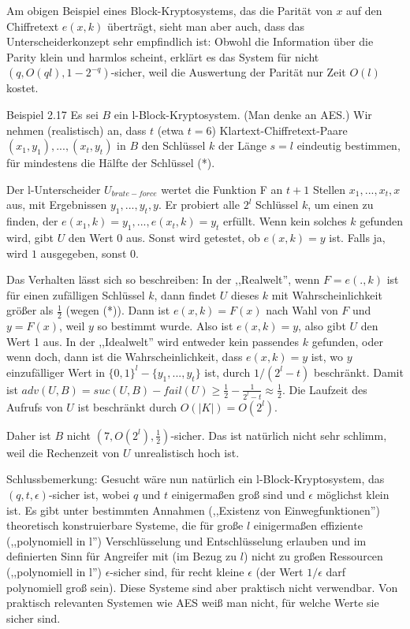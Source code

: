 \documentclass[a4paper]{article}
\begin{document}
\begin{multicols}{3}
    Am obigen Beispiel eines Block-Kryptosystems, das die Parität von $x$ auf den Chiffretext $e(x,k)$ überträgt, sieht man aber auch, dass das Unterscheiderkonzept sehr empfindlich ist: Obwohl die Information über die Parity klein und harmlos scheint, erklärt es das System für nicht $(q,O(ql), 1-2^{-q})$-sicher, weil die Auswertung der Parität nur Zeit $O(l)$ kostet.

    Beispiel 2.17 Es sei $B$ ein l-Block-Kryptosystem. (Man denke an AES.) Wir nehmen (realistisch) an, dass $t$ (etwa $t=6$) Klartext-Chiffretext-Paare $(x_1,y_1),...,(x_t,y_t)$ in $B$ den Schlüssel $k$ der Länge $s=l$ eindeutig bestimmen, für mindestens die Hälfte der Schlüssel (*).

    Der l-Unterscheider $U_{brute-force}$ wertet die Funktion F an $t+1$ Stellen $x_1,...,x_t,x$ aus, mit Ergebnissen $y_1,...,y_t,y$. Er probiert alle $2^l$ Schlüssel $k$, um einen zu finden, der $e(x_1,k)=y_1 ,...,e(x_t,k) =y_t$ erfüllt. Wenn kein solches $k$ gefunden wird, gibt $U$ den Wert $0$ aus.
    Sonst wird getestet, ob $e(x,k)=y$ ist. Falls ja, wird $1$ ausgegeben, sonst $0$.

    Das Verhalten lässt sich so beschreiben: In der ,,Realwelt'', wenn $F=e(.,k)$ ist für einen zufälligen Schlüssel $k$, dann findet $U$ dieses $k$ mit Wahrscheinlichkeit größer als $\frac{1}{2}$ (wegen (*)). Dann ist $e(x,k) =F(x)$ nach Wahl von $F$ und $y=F(x)$, weil $y$ so bestimmt wurde.
    Also ist $e(x,k) =y$, also gibt $U$ den Wert 1 aus. In der ,,Idealwelt'' wird entweder kein passendes $k$ gefunden, oder wenn doch, dann ist die Wahrscheinlichkeit, dass $e(x,k) =y$ ist, wo $y$ einzufälliger Wert in $\{0,1\}^l-\{y_1,...,y_t\}$ ist, durch $1/(2^l-t)$ beschränkt. Damit ist $adv(U,B) = suc(U,B)-fail(U)\geq \frac{1}{2}-\frac{1}{2^l-t}\approx\frac{1}{2}$.
    Die Laufzeit des Aufrufs von $U$ ist beschränkt durch $O(|K|) =O(2^l)$.

    Daher ist $B$ nicht $(7, O(2^l),\frac{1}{2})$-sicher. Das ist natürlich nicht sehr schlimm, weil die Rechenzeit von $U$ unrealistisch hoch ist.

    Schlussbemerkung: Gesucht wäre nun natürlich ein l-Block-Kryptosystem, das $(q,t,\epsilon)$-sicher ist, wobei $q$ und $t$ einigermaßen groß sind und $\epsilon$ möglichst klein ist. Es gibt unter bestimmten Annahmen (,,Existenz von Einwegfunktionen'') theoretisch konstruierbare Systeme, die für große $l$ einigermaßen effiziente (,,polynomiell in l'') Verschlüsselung und Entschlüsselung erlauben und im definierten Sinn für Angreifer mit (im Bezug zu $l$) nicht zu großen Ressourcen (,,polynomiell in l'') $\epsilon$-sicher sind, für recht kleine $\epsilon$ (der Wert $1/\epsilon$ darf polynomiell groß sein). Diese Systeme sind aber praktisch nicht verwendbar. Von praktisch relevanten Systemen wie AES weiß man nicht, für welche Werte sie sicher sind.


\end{multicols}
\end{document}
